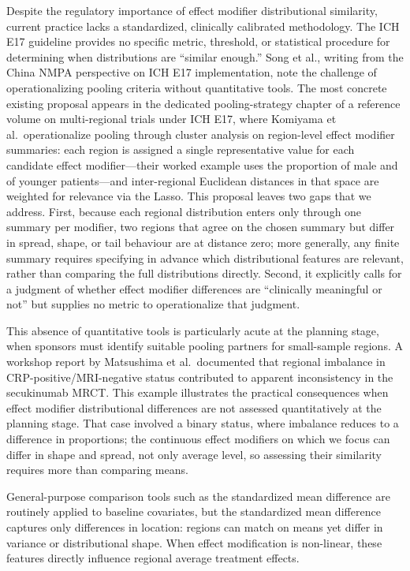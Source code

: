 \documentclass[AMA,Times1COL]{WileyNJDv5}
\begin{document}
Despite the regulatory importance of effect modifier distributional similarity, current practice lacks a standardized, clinically calibrated methodology. The ICH E17 guideline provides no specific metric, threshold, or statistical procedure for determining when distributions are ``similar enough.'' Song et al., writing from the China NMPA perspective on ICH E17 implementation, note the challenge of operationalizing pooling criteria without quantitative tools.\cite{song2025} The most concrete existing proposal appears in the dedicated pooling-strategy chapter of a reference volume on multi-regional trials under ICH E17, where Komiyama et al.\ operationalize pooling through cluster analysis on region-level effect modifier summaries: each region is assigned a single representative value for each candidate effect modifier---their worked example uses the proportion of male and of younger patients---and inter-regional Euclidean distances in that space are weighted for relevance via the Lasso.\cite{komiyama2024} This proposal leaves two gaps that we address. First, because each regional distribution enters only through one summary per modifier, two regions that agree on the chosen summary but differ in spread, shape, or tail behaviour are at distance zero; more generally, any finite summary requires specifying in advance which distributional features are relevant, rather than comparing the full distributions directly. Second, it explicitly calls for a judgment of whether effect modifier differences are ``clinically meaningful or not'' but supplies no metric to operationalize that judgment.

This absence of quantitative tools is particularly acute at the planning stage, when sponsors must identify suitable pooling partners for small-sample regions. A workshop report by Matsushima et al.\ documented that regional imbalance in CRP-positive/MRI-negative status contributed to apparent inconsistency in the secukinumab MRCT.\cite{matsushima2024} This example illustrates the practical consequences when effect modifier distributional differences are not assessed quantitatively at the planning stage. That case involved a binary status, where imbalance reduces to a difference in proportions; the continuous effect modifiers on which we focus can differ in shape and spread, not only average level, so assessing their similarity requires more than comparing means.

General-purpose comparison tools such as the standardized mean difference are routinely applied to baseline covariates,\cite{austin2011} but the standardized mean difference captures only differences in location: regions can match on means yet differ in variance or distributional shape. When effect modification is non-linear, these features directly influence regional average treatment effects.
\end{document}
